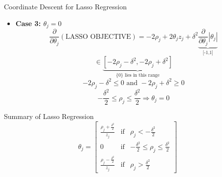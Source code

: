 \documentclass{beamer}
\begin{document}
\begin{frame}{Coordinate Descent for Lasso Regression}
\begin{itemize}
\item \textbf{Case 3: $\theta_{j} = 0$}
\[
\frac{\partial}{\partial \theta_{j}}(\text {LASSO OBJECTIVE})=-2 \rho_{j}+2\theta_{j} z_{j}+ \delta^{2}\underbrace{{\frac{\partial}{\partial \theta_{j}}}\left|\theta_{j}\right|}_{\text{[-1,1]}}
\]
\[
\in \underbrace{[-2\rho_{j} - \delta^{2}, -2\rho_{j} + \delta^{2}]}_{\text{$\{0\}$ lies in this range}}
\]
\[
-2\rho_{j} - \delta^{2} \leq 0 \text{ and } -2\rho_{j} + \delta^{2} \geq 0
\]
\[
-\frac{\delta^{2}}{2} \leq \rho_j \leq \frac{\delta^{2}}{2}  \Rightarrow \theta_{j}=0
\]

\end{itemize}

\end{frame}
\begin{frame}{Summary of Lasso Regression}
\begin{equation}
\theta_{j} =\left[\begin{array}{ccc}
\frac{\rho_{j} + \frac{\delta^{2}}{2}}{z_{j}} & \text{if}  & \rho_{j}<-\frac{\delta^{2}}{2} \\
0 & \text{if} & -\frac{\delta^{2}}{2} \leq \rho_{j} \leq \frac{\delta^{2}}{2} \\
\frac{\rho_{j} - \frac{\delta^{2}}{2}}{z_{j}} & \text{if} & \rho_{j}>\frac{\delta^{2}}{2}
\end{array}\right]
\end{equation}

\end{frame}

%
\end{document}
